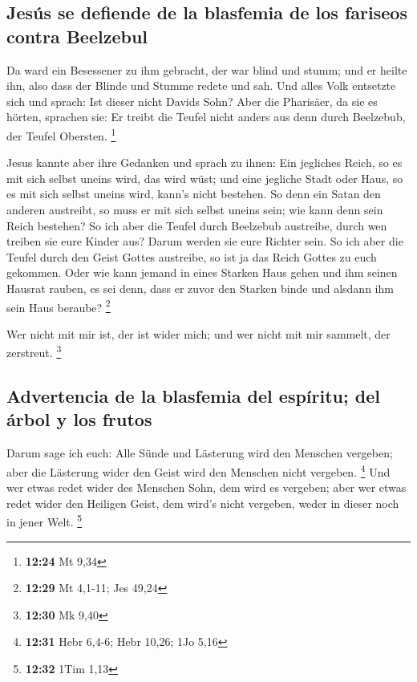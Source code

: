 \hypertarget{jesuxfas-se-defiende-de-la-blasfemia-de-los-fariseos-contra-beelzebul}{%
\subsection{Jesús se defiende de la blasfemia de los fariseos contra
Beelzebul}\label{jesuxfas-se-defiende-de-la-blasfemia-de-los-fariseos-contra-beelzebul}}

 Da ward ein Besessener zu ihm gebracht, der war blind
und stumm; und er heilte ihn, also dass der Blinde und Stumme redete und
sah.  Und alles Volk entsetzte sich und sprach: Ist
dieser nicht Davids Sohn?  Aber die Pharisäer, da sie es
hörten, sprachen sie: Er treibt die Teufel nicht anders aus denn durch
Beelzebub, der Teufel Obersten. \footnote{\textbf{12:24} Mt 9,34}

 Jesus kannte aber ihre Gedanken und sprach zu ihnen: Ein
jegliches Reich, so es mit sich selbst uneins wird, das wird wüst; und
eine jegliche Stadt oder Haus, so es mit sich selbst uneins wird, kann's
nicht bestehen.  So denn ein Satan den anderen austreibt,
so muss er mit sich selbst uneins sein; wie kann denn sein Reich
bestehen?  So ich aber die Teufel durch Beelzebub
austreibe, durch wen treiben sie eure Kinder aus? Darum werden sie eure
Richter sein.  So ich aber die Teufel durch den Geist
Gottes austreibe, so ist ja das Reich Gottes zu euch gekommen.
 Oder wie kann jemand in eines Starken Haus gehen und ihm
seinen Hausrat rauben, es sei denn, dass er zuvor den Starken binde und
alsdann ihm sein Haus beraube? \footnote{\textbf{12:29} Mt 4,1-11; Jes
  49,24}

 Wer nicht mit mir ist, der ist wider mich; und wer nicht
mit mir sammelt, der zerstreut. \footnote{\textbf{12:30} Mk 9,40}

\hypertarget{advertencia-de-la-blasfemia-del-espuxedritu-del-uxe1rbol-y-los-frutos}{%
\subsection{Advertencia de la blasfemia del espíritu; del árbol y los
frutos}\label{advertencia-de-la-blasfemia-del-espuxedritu-del-uxe1rbol-y-los-frutos}}

 Darum sage ich euch: Alle Sünde und Lästerung wird den
Menschen vergeben; aber die Lästerung wider den Geist wird den Menschen
nicht vergeben. \footnote{\textbf{12:31} Hebr 6,4-6; Hebr 10,26; 1Jo
  5,16}  Und wer etwas redet wider des Menschen Sohn, dem
wird es vergeben; aber wer etwas redet wider den Heiligen Geist, dem
wird's nicht vergeben, weder in dieser noch in jener Welt. \footnote{\textbf{12:32}
  1Tim 1,13}

